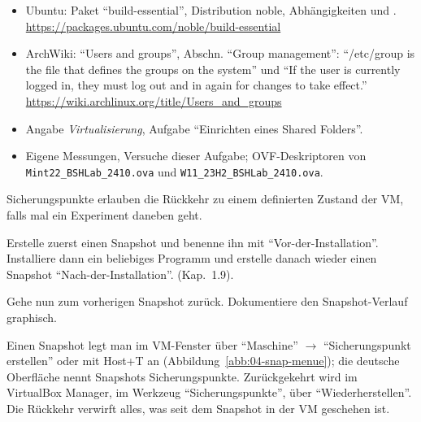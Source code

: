 \begin{itemize}[quellen]
  \item Ubuntu: Paket \enquote{build-essential}, Distribution noble, Abhängigkeiten  und . \url{https://packages.ubuntu.com/noble/build-essential}
  \item ArchWiki: \enquote{Users and groups}, Abschn. \enquote{Group management}: \enquote{/etc/group is the file that defines the groups on the system} und \enquote{If the user is currently logged in, they must log out and in again for changes to take effect.} \url{https://wiki.archlinux.org/title/Users_and_groups}
  \item Angabe \emph{Virtualisierung}, Aufgabe \enquote{Einrichten eines Shared Folders}.
  \item Eigene Messungen, Versuche dieser Aufgabe; OVF-Deskriptoren von \nolinkurl{Mint22_BSHLab_2410.ova} und \nolinkurl{W11_23H2_BSHLab_2410.ova}.
\end{itemize}

\begin{aufgabe}
Sicherungspunkte erlauben die Rückkehr zu einem definierten Zustand der VM, falls mal ein Experiment daneben geht.

Erstelle zuerst einen Snapshot und benenne ihn mit \enquote{Vor-der-Installation}. Installiere dann ein beliebiges Programm und erstelle danach wieder einen Snapshot \enquote{Nach-der-Installation}. (Kap.~1.9).

Gehe nun zum vorherigen Snapshot zurück. Dokumentiere den Snapshot-Verlauf graphisch.
\end{aufgabe}
\label{sec:snap-praxis}

Einen Snapshot legt man im VM-Fenster über \enquote{Maschine} $\rightarrow$ \enquote{Sicherungspunkt erstellen} oder mit Host+T an (Abbildung~\ref{abb:04-snap-menue}); die deutsche Oberfläche nennt Snapshots Sicherungspunkte. Zurückgekehrt wird im VirtualBox Manager, im Werkzeug \enquote{Sicherungspunkte}, über \enquote{Wiederherstellen}. Die Rückkehr verwirft alles, was seit dem Snapshot in der VM geschehen ist.


